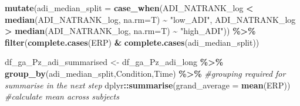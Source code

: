 \documentclass[
]{article}
\newenvironment{Shaded}{\begin{snugshade}}{\end{snugshade}}
\newcommand{\AttributeTok}[1]{\textcolor[rgb]{0.13,0.29,0.53}{#1}}
\newcommand{\CommentTok}[1]{\textcolor[rgb]{0.56,0.35,0.01}{\textit{#1}}}
\newcommand{\FunctionTok}[1]{\textcolor[rgb]{0.13,0.29,0.53}{\textbf{#1}}}
\newcommand{\NormalTok}[1]{#1}
\newcommand{\OtherTok}[1]{\textcolor[rgb]{0.56,0.35,0.01}{#1}}
\newcommand{\SpecialCharTok}[1]{\textcolor[rgb]{0.81,0.36,0.00}{\textbf{#1}}}
\newcommand{\StringTok}[1]{\textcolor[rgb]{0.31,0.60,0.02}{#1}}
\begin{document}
\begin{Shaded}
\begin{Highlighting}[]
  \FunctionTok{mutate}\NormalTok{(}\AttributeTok{adi\_median\_split =} \FunctionTok{case\_when}\NormalTok{(ADI\_NATRANK\_log }\SpecialCharTok{\textless{}} \FunctionTok{median}\NormalTok{(ADI\_NATRANK\_log, }\AttributeTok{na.rm=}\NormalTok{T) }\SpecialCharTok{\textasciitilde{}} \StringTok{"low\_ADI"}\NormalTok{,}
\NormalTok{                                       ADI\_NATRANK\_log }\SpecialCharTok{\textgreater{}} \FunctionTok{median}\NormalTok{(ADI\_NATRANK\_log, }\AttributeTok{na.rm=}\NormalTok{T) }\SpecialCharTok{\textasciitilde{}} \StringTok{"high\_ADI"}\NormalTok{)) }\SpecialCharTok{\%\textgreater{}\%}
  \FunctionTok{filter}\NormalTok{(}\FunctionTok{complete.cases}\NormalTok{(ERP) }\SpecialCharTok{\&} \FunctionTok{complete.cases}\NormalTok{(adi\_median\_split))}

\NormalTok{df\_ga\_Pz\_adi\_summarised }\OtherTok{\textless{}{-}}\NormalTok{ df\_ga\_Pz\_adi\_long }\SpecialCharTok{\%\textgreater{}\%}
  \FunctionTok{group\_by}\NormalTok{(adi\_median\_split,Condition,Time) }\SpecialCharTok{\%\textgreater{}\%} \CommentTok{\#grouping required for summarise in the next step}
\NormalTok{  dplyr}\SpecialCharTok{::}\FunctionTok{summarise}\NormalTok{(}\AttributeTok{grand\_average =} \FunctionTok{mean}\NormalTok{(ERP)) }\CommentTok{\#calculate mean across subjects}


\end{Highlighting}
\end{Shaded}
\end{document}
